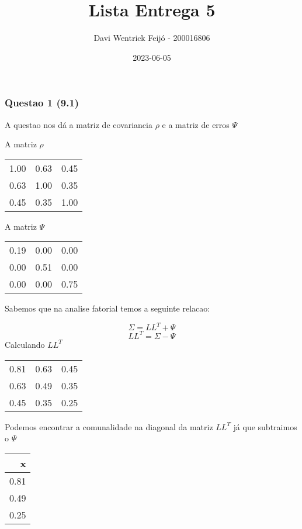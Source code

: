 \documentclass[
]{article}
\title{Lista Entrega 5}
\author{Davi Wentrick Feijó - 200016806}
\date{2023-06-05}
\begin{document}
\maketitle

\hypertarget{questao-1-9.1}{%
\subsubsection{Questao 1 (9.1)}\label{questao-1-9.1}}

A questao nos dá a matriz de covariancia \(\rho\) e a matriz de erros
\(\Psi\)

A matriz \(\rho\)

\begin{longtable}[]{@{}rrr@{}}
\toprule()
\endhead
1.00 & 0.63 & 0.45 \\
0.63 & 1.00 & 0.35 \\
0.45 & 0.35 & 1.00 \\
\bottomrule()
\end{longtable}

A matriz \(\Psi\)

\begin{longtable}[]{@{}rrr@{}}
\toprule()
\endhead
0.19 & 0.00 & 0.00 \\
0.00 & 0.51 & 0.00 \\
0.00 & 0.00 & 0.75 \\
\bottomrule()
\end{longtable}

Sabemos que na analise fatorial temos a seguinte relacao:

\[
\Sigma = LL^T + \Psi
\] \[
LL^T = \Sigma - \Psi
\] Calculando \(LL^T\)

\begin{longtable}[]{@{}rrr@{}}
\toprule()
\endhead
0.81 & 0.63 & 0.45 \\
0.63 & 0.49 & 0.35 \\
0.45 & 0.35 & 0.25 \\
\bottomrule()
\end{longtable}

Podemos encontrar a comunalidade na diagonal da matriz \(LL^T\) já que
subtraimos o \(\Psi\)

\begin{longtable}[]{@{}r@{}}
\toprule()
x \\
\midrule()
\endhead
0.81 \\
0.49 \\
0.25 \\
\bottomrule()
\end{longtable}
\end{document}

